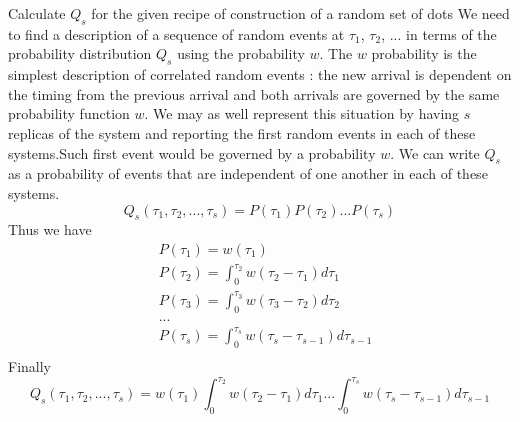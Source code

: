 

Calculate $Q_s$ for the given recipe of construction of a random set of dots
We need to find a description of a sequence of random events at $\tau_1$, $\tau_2$, ... in terms of the probability distribution $Q_s$ using the probability $w$. The $w$ probability is the simplest description of correlated random events : the new arrival is dependent on the timing from the previous arrival and both arrivals are governed by the same probability function $w$. We may as well represent this situation by having $s$ replicas of the system and reporting the first random events in each of these systems.Such first event would be governed by a probability $w$. We can write $Q_s$ as a probability of events that are independent of one another in each of these systems.
\begin{equation}
Q_s(\tau_1, \tau_2,...,\tau_s)=P(\tau_1)P(\tau_2)...P(\tau_s)
\end{equation}
Thus we have
\begin{equation}
\begin{split}
& P(\tau_1)= w(\tau_1) \\
& P(\tau_2)= \int_{0}^{\tau_2}w(\tau_2-\tau_1)d\tau_1\\
& P(\tau_3)=  \int_{0}^{\tau_3}w(\tau_3-\tau_2)d\tau_2\\
& ... \\
& P(\tau_s)=  \int_{0}^{\tau_s}w(\tau_s-\tau_{s-1})d\tau_{s-1}\\
\end{split}
\end{equation}
Finally
\begin{equation}
Q_s(\tau_1, \tau_2,...,\tau_s)=w(\tau_1)\int_{0}^{\tau_2}w(\tau_2-\tau_1)d\tau_1...\int_{0}^{\tau_s}w(\tau_s-\tau_{s-1})d\tau_{s-1}
\end{equation}